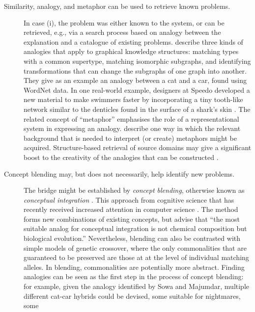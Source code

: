 \begin{description}                      
\item[Similarity, analogy, and metaphor can be used to retrieve known problems.]
  In case (i), the problem was either known to the system,
  or can be retrieved, e.g., via a search process based on analogy
  between the explanation and a catalogue of existing problems.
  \citet{sowa2003analogical} describe three kinds of analogies that
  apply to graphical knowledge structures: matching types with a
  common supertype, matching isomorphic subgraphs, and identifying
  transformations that can change the subgraphs of one graph into
  another.  They give as an example an analogy between a cat and a
  car, found using WordNet data.  In one real-world example, designers
  at Speedo developed a new material to make swimmers faster by
  incorporating a tiny tooth-like network similar to the denticles
  found in the surface of a shark's skin \cite{ingledew2016how}.  The
  related concept of ``metaphor'' emphasises the role of a
  representational system in expressing an analogy.
  \citet{xiao2016meta4meaning} describe one way in which the relevant
  background that is needed to interpret (or create) metaphors might
  be acquired.  Structure-based retrieval of source domains may give a
  significant boost to the creativity of the analogies that can be
  constructed \cite{Donoghue2002}.
\item[Concept blending may, but does not necessarily, help identify new problems.]
  The bridge might be established by \emph{concept
  blending}, otherwise known as \emph{conceptual integration}
  \cite{fauconnier2008way,fauconnier1998conceptual}.  This approach
  from cognitive science that has recently received increased
  attention in computer science
  \cite{confalonieri2018concepts,besold2015analogy,EPPE2018105}.  The
  method forms new combinations of existing concepts, but
  \citet{fauconnier1998conceptual} advise that ``the most suitable
  analog for conceptual integration is not chemical composition but
  biological evolution.''  Nevertheless, blending can also be
  contrasted with simple models of genetic crossover, where the only
  commonalities that are guaranteed to be preserved are those at at
  the level of individual matching alleles.  In blending, commonalities are
  potentially more abstract.  Finding analogies can be seen as the
  first step in the process of concept blending: for example, given
  the analogy identified by Sowa and Majumdar, multiple different
  cat-car hybrids could be devised, some suitable for nightmares, some

\end{description}
